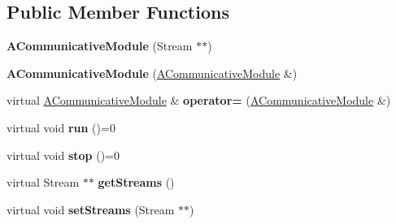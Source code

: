 \subsection*{Public Member Functions}
\begin{DoxyCompactItemize}
\item 
\mbox{\label{classwood_box_1_1module_1_1_a_communicative_module_a357c6c25f226ecdb6e954c4fa277b4c2}} 
{\bfseries A\+Communicative\+Module} (Stream $\ast$$\ast$)
\item 
\mbox{\label{classwood_box_1_1module_1_1_a_communicative_module_af7d03d4e9ea7322b966af682f6106fd6}} 
{\bfseries A\+Communicative\+Module} (\mbox{\hyperlink{classwood_box_1_1module_1_1_a_communicative_module}{A\+Communicative\+Module}} \&)
\item 
\mbox{\label{classwood_box_1_1module_1_1_a_communicative_module_a2096b6a0f266d939000eb94b1b7275e3}} 
virtual \mbox{\hyperlink{classwood_box_1_1module_1_1_a_communicative_module}{A\+Communicative\+Module}} \& {\bfseries operator=} (\mbox{\hyperlink{classwood_box_1_1module_1_1_a_communicative_module}{A\+Communicative\+Module}} \&)
\item 
\mbox{\label{classwood_box_1_1module_1_1_a_communicative_module_afe8f1f438d36069c84818c7c2803266d}} 
virtual void {\bfseries run} ()=0
\item 
\mbox{\label{classwood_box_1_1module_1_1_a_communicative_module_aaedcc9c9798b58a7aed8cf615404ef31}} 
virtual void {\bfseries stop} ()=0
\item 
\mbox{\label{classwood_box_1_1module_1_1_a_communicative_module_ab990133775319a847c0de840046be9a0}} 
virtual Stream $\ast$$\ast$ {\bfseries get\+Streams} ()
\item 
\mbox{\label{classwood_box_1_1module_1_1_a_communicative_module_abbca011edc33ea96c257d6e0170ebedc}} 
virtual void {\bfseries set\+Streams} (Stream $\ast$$\ast$)
\end{DoxyCompactItemize}
